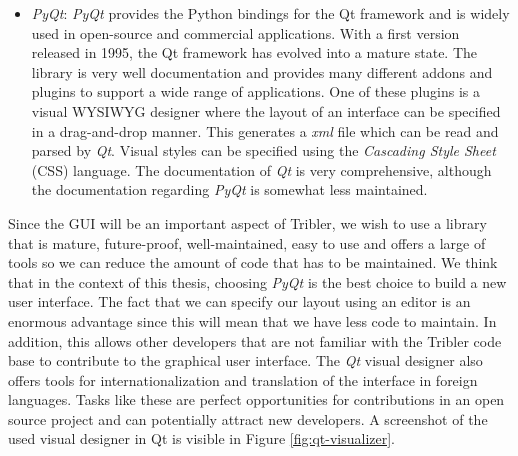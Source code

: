 \begin{itemize}
	\item \emph{PyQt}\cite{summerfield2007rapid}: \emph{PyQt} provides the Python bindings for the Qt framework and is widely used in open-source and commercial applications. With a first version released in 1995, the Qt framework has evolved into a mature state. The library is very well documentation and provides many different addons and plugins to support a wide range of applications. One of these plugins is a visual WYSIWYG designer where the layout of an interface can be specified in a drag-and-drop manner. This generates a \emph{xml} file which can be read and parsed by \emph{Qt}. Visual styles can be specified using the  \emph{Cascading Style Sheet} (CSS) language. The documentation of \emph{Qt} is very comprehensive, although the documentation regarding \emph{PyQt} is somewhat less maintained.
\end{itemize}
Since the GUI will be an important aspect of Tribler, we wish to use a library that is mature, future-proof, well-maintained, easy to use and offers a large of tools so we can reduce the amount of code that has to be maintained. We think that in the context of this thesis, choosing \emph{PyQt} is the best choice to build a new user interface. The fact that we can specify our layout using an editor is an enormous advantage since this will mean that we have less code to maintain. In addition, this allows other developers that are not familiar with the Tribler code base to contribute to the graphical user interface. The \emph{Qt} visual designer also offers tools for internationalization and translation of the interface in foreign languages. Tasks like these are perfect opportunities for contributions in an open source project and can potentially attract new developers. A screenshot of the used visual designer in Qt is visible in Figure \ref{fig:qt-visualizer}.

